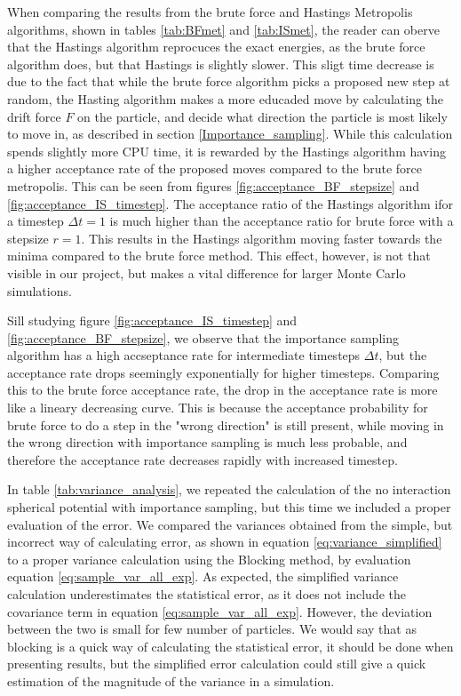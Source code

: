 \documentclass[norsk,a4paper,12pt]{article}
\begin{document}
When comparing the results from the brute force and Hastings Metropolis algorithms, shown in tables \ref{tab:BFmet} and \ref{tab:ISmet}, the reader can oberve that the Hastings algorithm reprocuces the exact energies, as the brute force algorithm does, but that Hastings is slightly slower. This sligt time decrease is due to the fact that while the brute force algorithm picks a proposed new step at random, the Hasting algorithm makes a more educaded move by calculating the drift force $F$ on the particle, and decide what direction the particle is most likely to move in, as described in section \ref{Importance_sampling}. While this calculation spends slightly more CPU time, it is rewarded by the Hastings algorithm having a higher acceptance rate of the proposed moves compared to the brute force metropolis. This can be seen from figures \ref{fig:acceptance_BF_stepsize} and \ref{fig:acceptance_IS_timestep}. The acceptance ratio of the Hastings algorithm ifor a timestep $\Delta t =1$ is much higher than the acceptance ratio for brute force with a stepsize $r=1$. This results in the Hastings algorithm moving faster towards the minima compared to the brute force method. This effect, however, is not that visible in our project, but makes a vital difference for larger Monte Carlo simulations.
\par 
\vspace{3mm}

Sill studying figure \ref{fig:acceptance_IS_timestep} and \ref{fig:acceptance_BF_stepsize}, we observe that the importance sampling algorithm has a high accseptance rate for intermediate timesteps $\Delta t$, but the acceptance rate drops seemingly exponentially for higher timesteps. Comparing this to the brute force acceptance rate, the drop in the acceptance rate is more like a lineary decreasing curve. This is because the acceptance probability for brute force to do a step in the "wrong direction" is still present, while moving in the wrong direction with importance sampling is much less probable, and therefore the acceptance rate decreases rapidly with increased timestep.
\par 
\vspace{3mm}

In table \ref{tab:variance_analysis}, we repeated the calculation of the no interaction spherical potential with importance sampling, but this time we included a proper evaluation of the error. We compared the variances obtained from the simple, but incorrect way of calculating error, as shown in equation \ref{eq:variance_simplified} to a proper variance calculation using the Blocking method, by evaluation equation \ref{eq:sample_var_all_exp}. As expected, the simplified variance calculation underestimates the statistical error, as it does not include the covariance term in equation \ref{eq:sample_var_all_exp}. However, the deviation between the two is small for few number of particles. We would say that as blocking is a quick way of calculating the statistical error, it should be done when presenting results, but the simplified error calculation could still give a quick estimation of the magnitude of the variance in a simulation.
\par 
\vspace{3mm}
\end{document}
